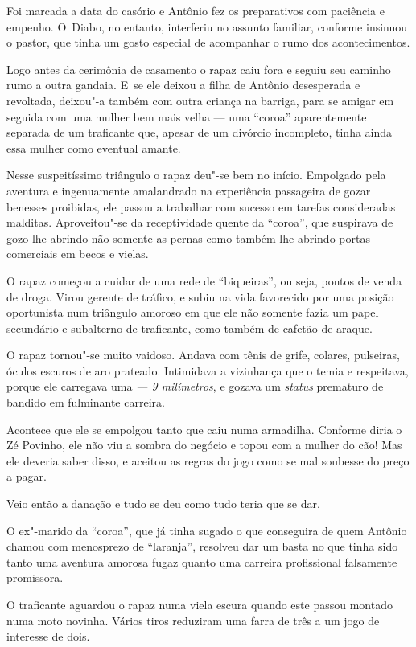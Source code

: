Foi marcada a data do casório e Antônio fez os preparativos com
paciência e empenho. O~Diabo, no entanto, interferiu no assunto
familiar, conforme insinuou o pastor, que tinha um gosto especial de
acompanhar o rumo dos acontecimentos.

Logo antes da cerimônia de casamento o rapaz caiu fora e seguiu seu
caminho rumo a outra gandaia. E~se ele deixou a filha de Antônio desesperada e revoltada, deixou"-a
também com outra criança na barriga, para se amigar em seguida com uma
mulher bem mais velha --- uma ``coroa'' aparentemente separada de um
traficante que, apesar de um divórcio incompleto, tinha ainda essa
mulher como eventual amante.

Nesse suspeitíssimo triângulo o rapaz deu"-se bem no início. Empolgado
pela aventura e ingenuamente amalandrado na experiência passageira de
gozar benesses proibidas, ele passou a trabalhar com sucesso em tarefas
consideradas malditas. Aproveitou"-se da receptividade quente da
``coroa'', que suspirava de gozo lhe abrindo não somente as pernas como
também lhe abrindo portas comerciais em becos e vielas.

O rapaz começou a cuidar de uma rede de ``biqueiras'', ou seja, pontos
de venda de droga. Virou gerente de tráfico, e subiu na vida favorecido
por uma posição oportunista num triângulo amoroso em que ele não somente
fazia um papel secundário e subalterno de traficante, como também de
cafetão de araque.

O rapaz tornou"-se muito vaidoso. Andava com tênis de grife, colares,
pulseiras, óculos escuros de aro prateado. Intimidava a vizinhança que o
temia e respeitava, porque ele carregava uma \emph{ --- 9 milímetros},
e gozava um \emph{status} prematuro de bandido em fulminante carreira.

Acontece que ele se empolgou tanto que caiu numa armadilha. Conforme
diria o Zé Povinho, ele não viu a sombra do negócio e topou com a mulher
do cão! Mas ele deveria saber disso, e aceitou as regras do jogo como se
mal soubesse do preço a pagar.

Veio então a danação e tudo se deu como tudo teria que se dar.

O ex"-marido da ``coroa'', que já tinha sugado o que conseguira de quem
Antônio chamou com menosprezo de ``laranja'', resolveu dar um basta no
que tinha sido tanto uma aventura amorosa fugaz quanto uma carreira
profissional falsamente promissora.

O traficante aguardou o rapaz numa viela escura quando este passou
montado numa moto novinha. Vários tiros reduziram uma farra de três a um
jogo de interesse de dois.

